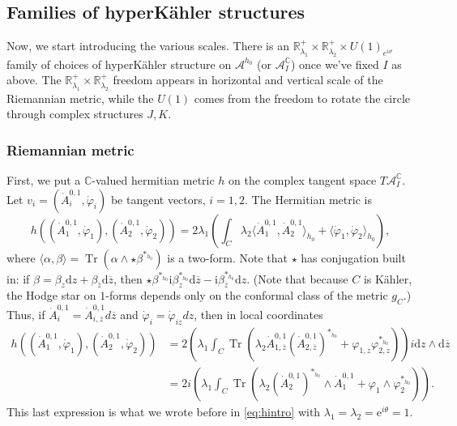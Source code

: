 \documentclass[12pt,letterpaper,reqno]{amsart}
\theoremstyle{remark}
\theoremstyle{definition}
\numberwithin{thm}{section}
\numberwithin{equation}{section}
\numberwithin{figure}{section}
\newcommand{\C}{\ensuremath{\mathbb C}}
\newcommand{\zbar}{{\ensuremath{\overline{z}}}}
\newcommand{\I}{{\mathrm i}}
\newcommand{\e}{{\mathrm e}}
\newcommand{\de}{\mathrm{d}}
\newcommand{\IP}[1]{\langle#1\rangle}
\DeclareMathOperator{\Tr}{Tr}
\begin{document}
\subsection{Families of \texorpdfstring{hyperK\"ahler}{hyperKahler} structures} 

Now, we start introducing the various scales.  There is an $\mathbb{R}_{\lambda_1}^+ \times \mathbb{R}_{\lambda_2}^+ \times U(1)_{e^{i \vartheta}}$ family of choices of hyperK\"ahler structure on $\mathcal{A}^{h_0}$ (or $\mathcal{A}_I^{\C}$) once we've fixed $I$ as above. The $\mathbb{R}_{\lambda_1}^+ \times \mathbb{R}_{\lambda_2}^+$ freedom appears in horizontal and vertical scale of the Riemannian metric, while the $U(1)$ comes from the freedom to rotate the circle through complex structures $J, K$.


\subsubsection{Riemannian metric}
First, we put a $\mathbb{C}$-valued hermitian metric $h$ on the complex tangent space $T\mathcal{A}_I^{\C}$. Let $v_i = (\dot A_i^{0,1}, \dot \varphi_i)$ be tangent vectors, $i=1,2$. The Hermitian metric is 
\begin{equation} \label{eq:metric1}
 h \left((\dot{A}^{0,1}_1, \dot{\varphi}_1), (\dot{A}^{0,1}_2, \dot{\varphi}_2)\right)
= 2  \lambda_1 \left(\int_C \lambda_2 \IP{\dot{A}^{0,1}_1, \dot{A}^{0,1}_2}_{h_0} + \IP{\dot\varphi_1, \dot\varphi_2}_{h_0} \right), 
\end{equation}
where $\IP{\alpha, \beta} = \Tr\left(\alpha \wedge \star \beta^{*_{h_0}} \right)$ is a two-form. Note that $\star$ has conjugation built in: if $\beta = \beta_z \de z + \beta_{\zbar} \de \zbar$, then $\star \beta^{*_{h_0}}%
\I \beta_z^{*_{h_0}} \de \zbar -  \I \beta_{\zbar}^{*_{h_0}} \de z$. (Note that because $C$ is K\"ahler, 
the Hodge star on $1$-forms depends only on the conformal class of the metric $g_C$.)
Thus, if $\dot A_i^{0,1} = \dot{A}_{i,\zbar}^{0,1} d \zbar$ and $\dot \varphi_i = \dot \varphi_{i z} d z$, then in local coordinates 
\begin{align} 
 h \left((\dot{A}^{0,1}_1, \dot{\varphi}_1), (\dot{A}^{0,1}_2, \dot{\varphi}_2)\right)
&= 2   \left( \lambda_1 \int_C \Tr  \left( \lambda_2 \dot{A}^{0,1}_{1,\zbar}  (\dot{A}^{0,1}_{2, \zbar} )^{*_{h_0}} + \varphi_{1,z} \varphi_{2,z}^{*_{h_0}}  \right) \right) i \de z \wedge \de \zbar \nonumber \\
& = 2i   \left( \lambda_1 \int_C \Tr  \left( \lambda_2 (\dot{A}^{0,1}_{2} )^{*_{h_0}} \wedge \dot{A}^{0,1}_{1}   + \varphi_{1} \wedge \varphi_{2}^{*_{h_0}}  \right) \right).
\end{align}
This last expression is what we wrote before in \eqref{eq:hintro} with $\lambda_1=\lambda_2=\e^{i \theta}=1$.
\end{document}
